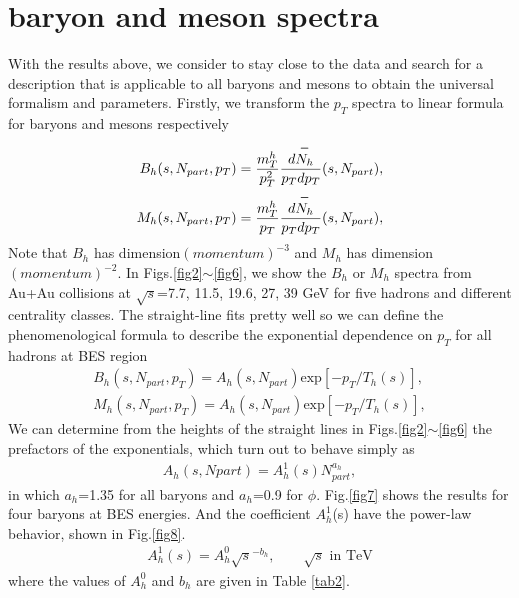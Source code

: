 \documentclass[twocolumn,aps,superscriptaddress,showpacs,nofootinbib,floatfix]{revtex4}
\begin{document}
\section{baryon and meson spectra}\label{BS3}
With the results above, we consider to stay close to the data and search for a description that is applicable to all baryons and mesons to obtain the universal formalism and parameters\cite{4u}. Firstly, we transform the $p_T$ spectra to linear formula for baryons and mesons respectively
\begin{eqnarray}
B_h(s,N_{part},p_T)=\frac{m_T^h}{p_T^2} {d\overset{\bm-}{N_h}\over p_T dp_T}(s,N_{part}),
\label{3.1}\\
M_h(s,N_{part},p_T)=\frac{m_T^h}{p_T} {d\overset{\bm-}{N_h}\over p_T dp_T}(s,N_{part}),
\label{3.2}
\end{eqnarray}
Note that $B_h$ has dimension$(momentum)^{-3}$ and $M_h$ has dimension$(momentum)^{-2}$. In Figs.\ref{fig2}$\sim$\ref{fig6}, we show the $B_h$ or $M_h$ spectra from Au+Au collisions at $\sqrt{s}$=7.7, 11.5, 19.6, 27, 39 GeV for five hadrons and different centrality classes. The straight-line fits pretty well so we can define the phenomenological formula to describe the exponential dependence on $p_T$ for all hadrons at BES region
\begin{eqnarray}
	B_h(s,N_{part},p_T)=A_h(s,N_{part})\text{exp}[-p_T/T_h(s)],
	\label{3.3}\\
	M_h(s,N_{part},p_T)=A_h(s,N_{part})\text{exp}[-p_T/T_h(s)],
	\label{3.4}
\end{eqnarray}
 We can determine from the heights of the straight lines in Figs.\ref{fig2}$\sim$\ref{fig6} the prefactors of the exponentials, which turn out to behave simply as\cite{4u}
\begin{eqnarray}
	A_h(s,Npart)=A_h^1(s)N_{part}^{a_h}, \label{3.7}
\end{eqnarray}
in which $a_h$=1.35 for all baryons and $a_h$=0.9 for $\phi$. Fig.\ref{fig7} shows the results for four baryons at BES energies. And the coefficient $A_h^1$(s) have the power-law behavior, shown in Fig.\ref{fig8}.
\begin{eqnarray}
	A_h^1(s)=A_h^0 \sqrt{s}^{-b_h}, \qquad  {\sqrt s} \text{ in TeV}
	\label{3.8}
\end{eqnarray}
where the values of $A_h^0$ and $b_h$ are given in Table \ref{tab2}.
\end{document}
